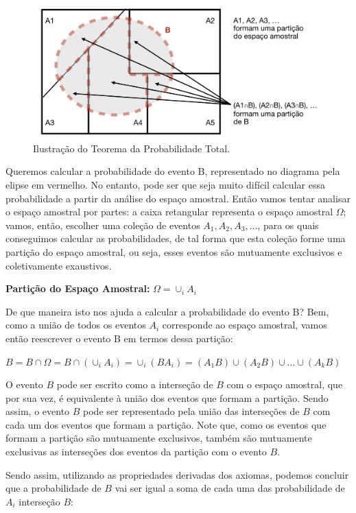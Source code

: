 \documentclass[
]{book}
\theoremstyle{definition}
\theoremstyle{definition}
\theoremstyle{definition}
\theoremstyle{remark}
\begin{document}
\begin{figure}
\includegraphics[width=0.8\linewidth]{img/TPT} \caption{Ilustração do Teorema da Probabilidade Total.}\label{fig:ch4-TPT}
\end{figure}

Queremos calcular a probabilidade do evento B, representado no diagrama pela elipse em vermelho. No entanto, pode ser que seja muito difícil calcular essa probabilidade a partir da análise do espaço amostral. Então vamos tentar analisar o espaço amostral por partes: a caixa retangular representa o espaço amostral \(\Omega\); vamos, então, escolher uma coleção de eventos \(A_1, A_2, A_3, \ldots\), para os quais conseguimos calcular as probabilidades, de tal forma que esta coleção forme uma partição do espaço amostral, ou seja, esses eventos são mutuamente exclusivos e coletivamente exaustivos.

\textbf{Partição do Espaço Amostral:} \(\Omega = \cup_i A_i\)

De que maneira isto nos ajuda a calcular a probabilidade do evento B? Bem, como a união de todos os eventos \(A_i\) corresponde ao espaço amostral, vamos então reescrever o evento B em termos dessa partição:

\(B = B\cap \Omega = B \cap (\cup_i A_i) = \cup_i (BA_i) = (A_1B) \cup (A_2B) \cup \ldots \cup (A_kB)\)

O evento \(B\) pode ser escrito como a interseção de \(B\) com o espaço amostral, que por sua vez, é equivalente à união dos eventos que formam a partição. Sendo assim, o evento \(B\) pode ser representado pela união das interseções de \(B\) com cada um dos eventos que formam a partição. Note que, como os eventos que formam a partição são mutuamente exclusivos, também são mutuamente exclusivas as interseções dos eventos da partição com o evento \(B\).

Sendo assim, utilizando as propriedades derivadas dos axiomas, podemos concluir que a probabilidade de \(B\) vai ser igual a soma de cada uma das probabilidade de \(A_i\) interseção \(B\):
\end{document}
